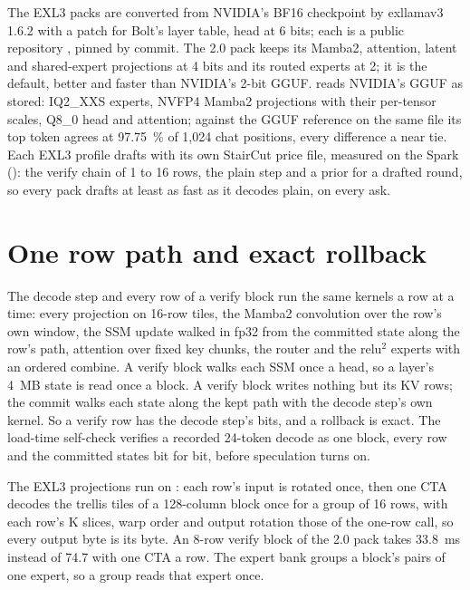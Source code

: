 The EXL3 packs are converted from NVIDIA's BF16 checkpoint by exllamav3 1.6.2 with a patch for Bolt's layer table, head at 6 bits; each is a public repository , pinned by commit. The 2.0 pack keeps its Mamba2, attention, latent and shared-expert projections at 4 bits and its routed experts at 2; it is the default, better and faster than NVIDIA's 2-bit GGUF.  reads NVIDIA's GGUF as stored: IQ2\_XXS experts, NVFP4 Mamba2 projections with their per-tensor scales, Q8\_0 head and attention; against the GGUF reference on the same file its top token agrees at 97.75~\% of 1,024 chat positions, every difference a near tie. Each EXL3 profile drafts with its own StairCut price file, measured on the Spark (): the verify chain of 1 to 16 rows, the plain step and a  prior for a drafted round, so every pack drafts at least as fast as it decodes plain, on every ask.

\section{One row path and exact rollback}

The decode step and every row of a verify block run the same kernels a row at a time: every projection on 16-row tiles, the Mamba2 convolution over the row's own window, the SSM update walked in fp32 from the committed state along the row's path, attention over fixed key chunks, the router and the relu$^2$ experts with an ordered combine. A verify block walks each SSM once a head, so a layer's 4~MB state is read once a block. A verify block writes nothing but its KV rows; the commit walks each state along the kept path with the decode step's own kernel. So a verify row has the decode step's bits, and a rollback is exact. The load-time self-check verifies a recorded 24-token decode as one block, every row and the committed states bit for bit, before speculation turns on.

The EXL3 projections run on : each row's input is rotated once, then one CTA decodes the trellis tiles of a 128-column block once for a group of 16 rows, with each row's K slices, warp order and output rotation those of the one-row  call, so every output byte is its byte. An 8-row verify block of the 2.0 pack takes 33.8~ms instead of 74.7 with one CTA a row. The expert bank groups a block's pairs of one expert, so a group reads that expert once.

